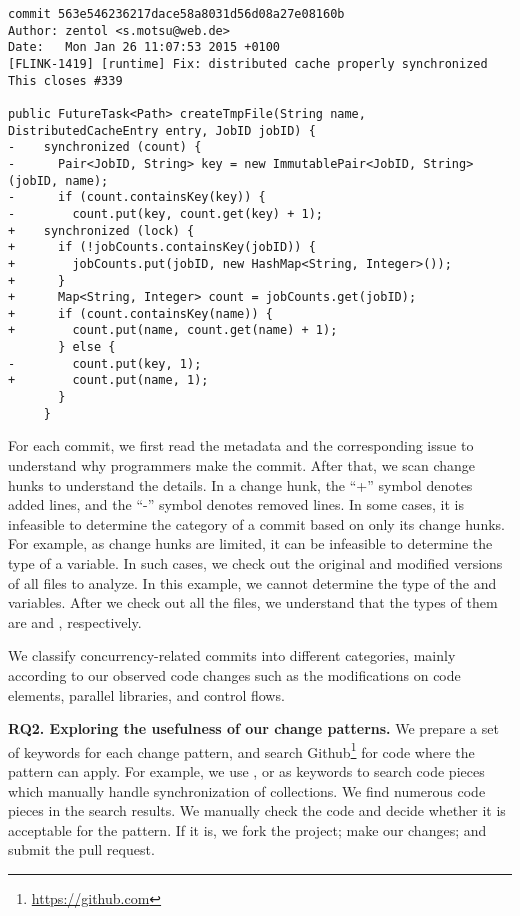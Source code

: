 \begin{lstlisting}
commit 563e546236217dace58a8031d56d08a27e08160b
Author: zentol <s.motsu@web.de>
Date:   Mon Jan 26 11:07:53 2015 +0100
[FLINK-1419] [runtime] Fix: distributed cache properly synchronized
This closes #339

public FutureTask<Path> createTmpFile(String name, DistributedCacheEntry entry, JobID jobID) {
-    synchronized (count) {
-      Pair<JobID, String> key = new ImmutablePair<JobID, String>(jobID, name);
-      if (count.containsKey(key)) {
-        count.put(key, count.get(key) + 1);
+    synchronized (lock) {
+      if (!jobCounts.containsKey(jobID)) {
+        jobCounts.put(jobID, new HashMap<String, Integer>());
+      }
+      Map<String, Integer> count = jobCounts.get(jobID);
+      if (count.containsKey(name)) {
+        count.put(name, count.get(name) + 1);
       } else {
-        count.put(key, 1);
+        count.put(name, 1);
       }
     }
\end{lstlisting}

For each commit, we first read the metadata and the corresponding issue to understand why programmers make the commit. After that, we scan change hunks to understand the details. In a change hunk, the ``+'' symbol denotes added lines, and the ``-'' symbol denotes removed lines. In some cases, it is infeasible to determine the category of a commit based on only its change hunks. For example, as change hunks are limited, it can be infeasible to determine the type of a variable. In such cases, we check out the original and modified versions of all files to analyze. In this example, we cannot determine the type of the  and  variables. After we check out all the files, we understand that the types of them are  and , respectively.

We classify concurrency-related commits into different categories, mainly according to our observed code changes such as the modifications on code elements, parallel libraries, and control flows.

\textbf{RQ2. Exploring the usefulness of our change patterns.} We prepare a set of keywords for each change pattern, and search Github\footnote{\url{https://github.com}} for code where the pattern can apply. For example, we use ,  or  as keywords to search code pieces which manually handle synchronization of collections. We find numerous code pieces in the search results. We manually check the code and decide whether it is acceptable for the pattern. If it is, we fork the project; make our changes; and submit the pull request.

